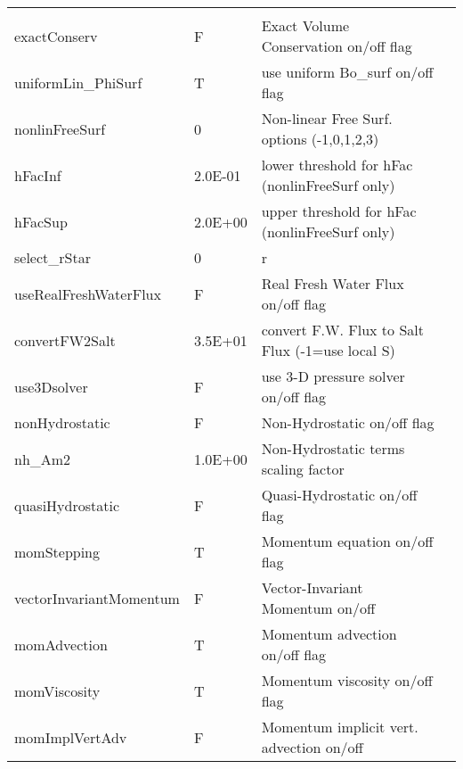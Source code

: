 \begin{table}
\begin{tabular}{lllc}
    &  %
    \\
   exactConserv   &                     F
    &   Exact Volume Conservation on/off flag
    &  %
    \\
   uniformLin\_PhiSurf   &                     T
    &   use uniform Bo\_surf on/off flag
    &  %
    \\
   nonlinFreeSurf   &                         0
    &   Non-linear Free Surf. options (-1,0,1,2,3)
    &  %
    \\
   hFacInf   &                   2.0E-01
    &   lower threshold for hFac (nonlinFreeSurf only)
    &  %
    \\
   hFacSup   &                   2.0E+00
    &   upper threshold for hFac (nonlinFreeSurf only)
    &  %
    \\
   select\_rStar   &                         0
    &   r
    &  %
    \\
   useRealFreshWaterFlux   &                     F
    &   Real Fresh Water Flux on/off flag
    &  %
    \\
   convertFW2Salt   &                   3.5E+01
    &   convert F.W. Flux to Salt Flux (-1=use local S)
    &  %
    \\
   use3Dsolver   &                     F
    &   use 3-D pressure solver on/off flag 
    &  %
    \\
   nonHydrostatic   &                     F
    &   Non-Hydrostatic on/off flag 
    &  %
    \\
   nh\_Am2   &                   1.0E+00
    &   Non-Hydrostatic terms scaling factor 
    &  %
    \\
   quasiHydrostatic   &                     F
    &   Quasi-Hydrostatic on/off flag 
    &  %
    \\
   momStepping   &                     T
    &   Momentum equation on/off flag 
    &  %
    \\
   vectorInvariantMomentum  &                     F
    &   Vector-Invariant Momentum on/off 
    &  %
    \\
   momAdvection   &                     T
    &   Momentum advection on/off flag 
    &  %
    \\
   momViscosity   &                     T
    &   Momentum viscosity on/off flag 
    &  %
    \\
   momImplVertAdv   &                     F
    &   Momentum implicit vert. advection on/off
    &  %

\end{tabular}
\end{table}
